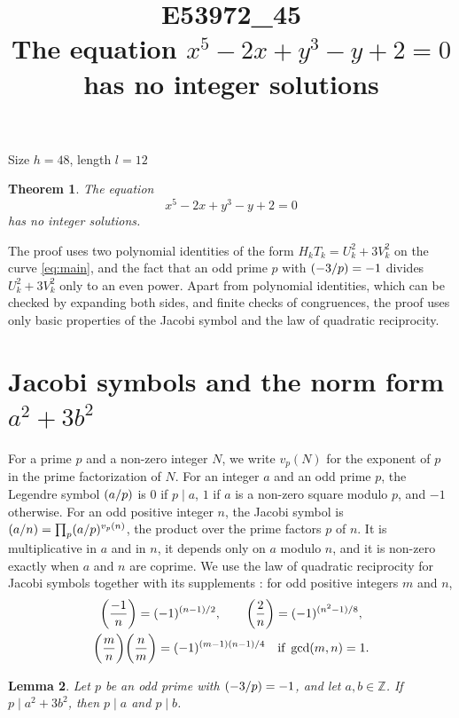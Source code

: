 \documentclass[11pt]{article}
\title{\textbf{E53972\_45}\\[4pt] {\Large The equation $x^{5}-2x+y^{3}-y+2=0$ has no integer solutions}}
\author{}
\date{}
\newtheorem{theorem}{Theorem}
\newtheorem{lemma}[theorem]{Lemma}
\newcommand{\Z}{\mathbb{Z}}
\newcommand{\leg}[2]{\mathchoice{\biggl(\dfrac{#1}{#2}\biggr)}{(#1/#2)}{(#1/#2)}{(#1/#2)}}
\begin{document}
\maketitle
\vspace{-8ex}
\begin{center}
Size $h=48$, length $l=12$
\end{center}

\begin{theorem}\label{thm:main}
The equation
\begin{equation}\label{eq:main}
x^{5}-2x+y^{3}-y+2=0
\end{equation}
has no integer solutions.
\end{theorem}

The proof uses two polynomial identities of the form $H_kT_k=U_k^2+3V_k^2$ on the curve \eqref{eq:main}, and the fact that an odd prime $p$ with $\leg{-3}{p}=-1$ divides $U_k^2+3V_k^2$ only to an even power. Apart from polynomial identities, which can be checked by expanding both sides, and finite checks of congruences, the proof uses only basic properties of the Jacobi symbol and the law of quadratic reciprocity.

\section{\texorpdfstring{Jacobi symbols and the norm form $a^2+3b^2$}{Jacobi symbols and the norm form}}

For a prime $p$ and a non-zero integer $N$, we write $v_p(N)$ for the exponent of $p$ in the prime factorization of $N$. For an integer $a$ and an odd prime $p$, the Legendre symbol $\leg{a}{p}$ is $0$ if $p\mid a$, $1$ if $a$ is a non-zero square modulo $p$, and $-1$ otherwise. For an odd positive integer $n$, the Jacobi symbol is $\leg{a}{n}=\prod_p\leg{a}{p}^{v_p(n)}$, the product over the prime factors $p$ of $n$. It is multiplicative in $a$ and in $n$, it depends only on $a$ modulo $n$, and it is non-zero exactly when $a$ and $n$ are coprime. We use the law of quadratic reciprocity for Jacobi symbols together with its supplements \cite[Chapter~5, \S2]{IR}: for odd positive integers $m$ and $n$,
\begin{gather*}
\leg{-1}{n}=(-1)^{(n-1)/2},\qquad\leg{2}{n}=(-1)^{(n^2-1)/8},\\
\leg{m}{n}\leg{n}{m}=(-1)^{(m-1)(n-1)/4}\quad\text{if }\gcd(m,n)=1.
\end{gather*}

\begin{lemma}\label{lem:divides}
Let $p$ be an odd prime with $\leg{-3}{p}=-1$, and let $a,b\in\Z$. If $p\mid a^2+3b^2$, then $p\mid a$ and $p\mid b$.
\end{lemma}
\end{document}
